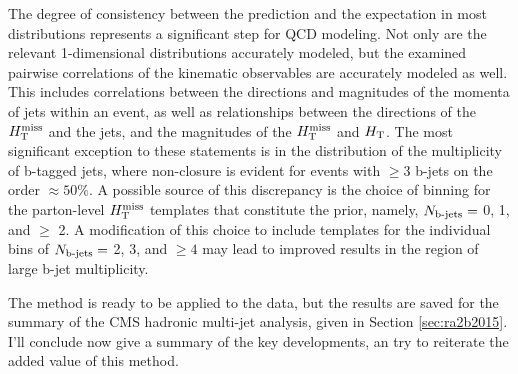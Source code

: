 \FloatBarrier
\noindent
The degree of consistency between the prediction and the expectation in most distributions represents a significant step for QCD modeling. Not only are the relevant 1-dimensional distributions accurately modeled, but the examined pairwise correlations of the kinematic observables are accurately modeled as well. This includes correlations between the directions and magnitudes of the momenta of jets within an event, as well as relationships between the directions of the $H_{\text{T}}^{\rm miss}$ and the jets, and the magnitudes of the $H_{\text{T}}^{\rm miss}$ and $H_{\rm T}$. The most significant exception to these statements is in the distribution of the multiplicity of b-tagged jets,  where non-closure is evident for events with $\geq 3$ b-jets on the order $\approx50\%$. A possible source of this discrepancy is the choice of binning for the parton-level $H_{\text{T}}^{\rm miss}$ templates that constitute the prior, namely, $N_{\text{b-jets}}=$ 0, 1, and $\geq$ 2.  A modification of this choice to include templates for the individual bins of $N_{\text{b-jets}}=$ 2, 3, and $\geq 4$ may lead to improved results in the region of large b-jet multiplicity. 

The method is ready to be applied to the data, but the results are saved for the summary of the CMS hadronic multi-jet analysis, given in Section \ref{sec:ra2b2015}. I'll conclude now give a summary of the key developments, an try to reiterate the added value of this method.

